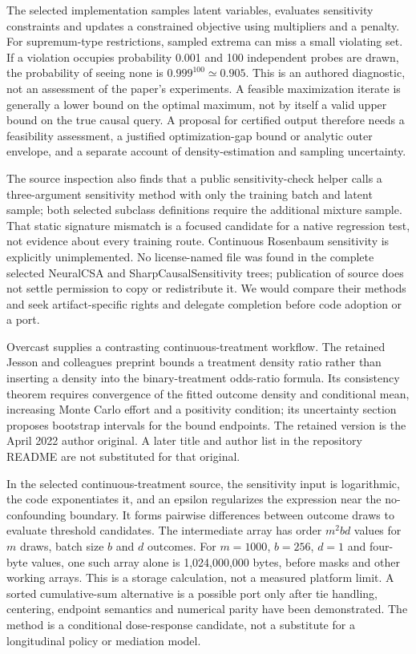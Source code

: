 The selected implementation samples latent variables, evaluates sensitivity constraints and updates a constrained objective using multipliers and a penalty. For supremum-type restrictions, sampled extrema can miss a small violating set. If a violation occupies probability 0.001 and 100 independent probes are drawn, the probability of seeing none is $0.999^{100}\simeq0.905$. This is an authored diagnostic, not an assessment of the paper's experiments. A feasible maximization iterate is generally a lower bound on the optimal maximum, not by itself a valid upper bound on the true causal query. A proposal for certified output therefore needs a feasibility assessment, a justified optimization-gap bound or analytic outer envelope, and a separate account of density-estimation and sampling uncertainty. \citep{exec25_pymed_neuralcsa,exec25_pymed_neural_paper,exec25_pymed_choice}

The source inspection also finds that a public sensitivity-check helper calls a three-argument sensitivity method with only the training batch and latent sample; both selected subclass definitions require the additional mixture sample. That static signature mismatch is a focused candidate for a native regression test, not evidence about every training route. Continuous Rosenbaum sensitivity is explicitly unimplemented. No license-named file was found in the complete selected NeuralCSA and SharpCausalSensitivity trees; publication of source does not settle permission to copy or redistribute it. We would compare their methods and seek artifact-specific rights and delegate completion before code adoption or a port. \citep{exec25_pymed_neuralcsa,exec25_pymed_sharp,exec25_pymed_choice}

Overcast supplies a contrasting continuous-treatment workflow. The retained Jesson and colleagues preprint bounds a treatment density ratio rather than inserting a density into the binary-treatment odds-ratio formula. Its consistency theorem requires convergence of the fitted outcome density and conditional mean, increasing Monte Carlo effort and a positivity condition; its uncertainty section proposes bootstrap intervals for the bound endpoints. The retained version is the April 2022 author original. A later title and author list in the repository README are not substituted for that original. \citep{exec25_pymed_overcast_paper,exec25_pymed_overcast}

In the selected continuous-treatment source, the sensitivity input is logarithmic, the code exponentiates it, and an epsilon regularizes the expression near the no-confounding boundary. It forms pairwise differences between outcome draws to evaluate threshold candidates. The intermediate array has order $m^2bd$ values for $m$ draws, batch size $b$ and $d$ outcomes. For $m=1000$, $b=256$, $d=1$ and four-byte values, one such array alone is 1,024,000,000 bytes, before masks and other working arrays. This is a storage calculation, not a measured platform limit. A sorted cumulative-sum alternative is a possible port only after tie handling, centering, endpoint semantics and numerical parity have been demonstrated. The method is a conditional dose-response candidate, not a substitute for a longitudinal policy or mediation model. \citep{exec25_pymed_overcast,exec25_pymed_choice}

